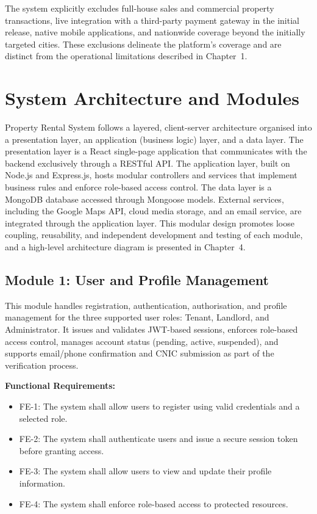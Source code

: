 The system explicitly excludes full-house sales and commercial property transactions, live integration with a third-party payment gateway in the initial release, native mobile applications, and nationwide coverage beyond the initially targeted cities. These exclusions delineate the platform's coverage and are distinct from the operational limitations described in Chapter~1.


\section{System Architecture and Modules}

Property Rental System follows a layered, client-server architecture organised into a presentation layer, an application (business logic) layer, and a data layer. The presentation layer is a React single-page application that communicates with the backend exclusively through a RESTful API. The application layer, built on Node.js and Express.js, hosts modular controllers and services that implement business rules and enforce role-based access control. The data layer is a MongoDB database accessed through Mongoose models. External services, including the Google Maps API, cloud media storage, and an email service, are integrated through the application layer. This modular design promotes loose coupling, reusability, and independent development and testing of each module, and a high-level architecture diagram is presented in Chapter~4.


\subsection{Module 1: User and Profile Management}

This module handles registration, authentication, authorisation, and profile management for the three supported user roles: Tenant, Landlord, and Administrator. It issues and validates JWT-based sessions, enforces role-based access control, manages account status (pending, active, suspended), and supports email/phone confirmation and CNIC submission as part of the verification process.

\textbf{Functional Requirements:}

\begin{itemize}
    \item FE-1: The system shall allow users to register using valid credentials and a selected role.
    \item FE-2: The system shall authenticate users and issue a secure session token before granting access.
    \item FE-3: The system shall allow users to view and update their profile information.
    \item FE-4: The system shall enforce role-based access to protected resources.
\end{itemize}

